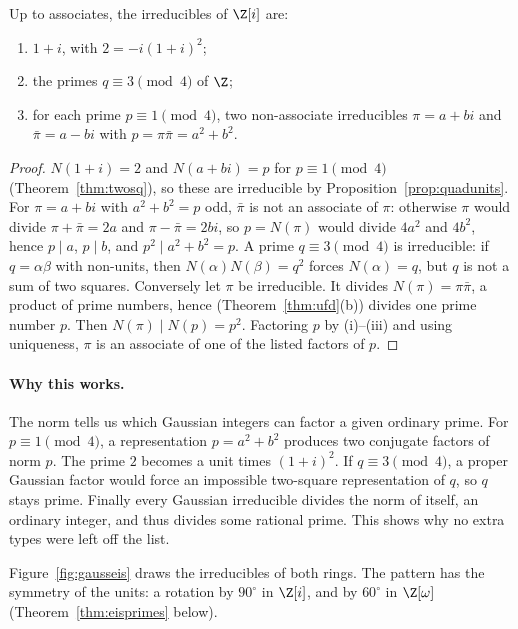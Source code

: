 \begin{theorem}\label{thm:gaussprimes}
Up to associates, the irreducibles of $\Z[i]$ are:
\begin{enumerate}[label=(\roman*)]
\item $1+i$, with $2=-i(1+i)^2$;
\item the primes $q\equiv3\pmod4$ of $\Z$;
\item for each prime $p\equiv1\pmod4$, two non-associate irreducibles $\pi=a+bi$ and $\bar\pi=a-bi$ with $p=\pi\bar\pi=a^2+b^2$.
\end{enumerate}
\end{theorem}
\begin{proof}
$N(1+i)=2$ and $N(a+bi)=p$ for $p\equiv1\pmod4$ (Theorem~\ref{thm:twosq}), so these are irreducible by Proposition~\ref{prop:quadunits}. For $\pi=a+bi$ with $a^2+b^2=p$ odd, $\bar\pi$ is not an associate of $\pi$: otherwise $\pi$ would divide $\pi+\bar\pi=2a$ and $\pi-\bar\pi=2bi$, so $p=N(\pi)$ would divide $4a^2$ and $4b^2$, hence $p\mid a$, $p\mid b$, and $p^2\mid a^2+b^2=p$. A prime $q\equiv3\pmod4$ is irreducible: if $q=\alpha\beta$ with non-units, then $N(\alpha)N(\beta)=q^2$ forces $N(\alpha)=q$, but $q$ is not a sum of two squares.
Conversely let $\pi$ be irreducible. It divides $N(\pi)=\pi\bar\pi$, a product of prime numbers, hence (Theorem~\ref{thm:ufd}(b)) divides one prime number $p$. Then $N(\pi)\mid N(p)=p^2$. Factoring $p$ by (i)--(iii) and using uniqueness, $\pi$ is an associate of one of the listed factors of $p$.
\end{proof}

\paragraph{Why this works.}
The norm tells us which Gaussian integers can factor a given ordinary prime. For $p\equiv1\pmod4$, a representation $p=a^2+b^2$ produces two conjugate factors of norm $p$. The prime $2$ becomes a unit times $(1+i)^2$. If $q\equiv3\pmod4$, a proper Gaussian factor would force an impossible two-square representation of $q$, so $q$ stays prime. Finally every Gaussian irreducible divides the norm of itself, an ordinary integer, and thus divides some rational prime. This shows why no extra types were left off the list.

Figure~\ref{fig:gausseis} draws the irreducibles of both rings. The pattern has the symmetry of the units: a rotation by $90^\circ$ in $\Z[i]$, and by $60^\circ$ in $\Z[\omega]$ (Theorem~\ref{thm:eisprimes} below).

